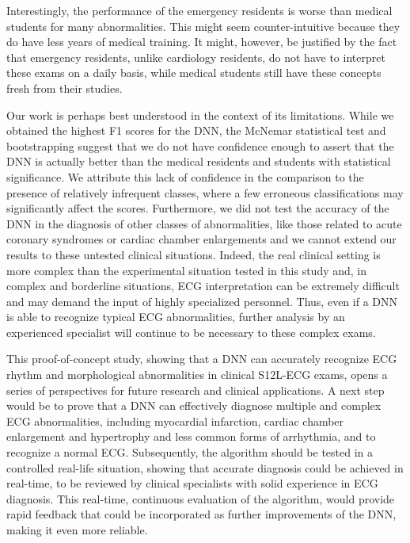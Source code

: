 \documentclass{article}
\begin{document}
Interestingly, the performance of the emergency residents is worse than medical students for many abnormalities. This might seem counter-intuitive because they do have less years of medical training. It might, however, be justified by the fact that emergency residents, unlike cardiology residents, do not have to interpret these exams on a daily basis, while medical students still have these concepts fresh from their studies.


Our work is perhaps best understood in the context of its limitations. While we obtained the highest F1 scores for the DNN, the McNemar statistical test and bootstrapping suggest that we do not have confidence enough to assert that the DNN is actually better than the medical residents and students with statistical significance. We attribute this lack of confidence in the comparison to the presence of relatively infrequent classes, where a few erroneous classifications may significantly affect the scores. Furthermore, we did not test the accuracy of the DNN in the diagnosis of other classes of abnormalities, like those related to acute coronary syndromes or cardiac chamber enlargements and we cannot extend our results to these untested clinical situations.  Indeed, the real clinical setting is  more complex than the experimental situation tested in this study and, in complex and borderline situations, ECG interpretation can be extremely difficult and may demand the input of highly specialized personnel. Thus, even if a DNN is able to recognize typical ECG abnormalities, further analysis by an experienced specialist will continue to be necessary to these complex exams. 

This proof-of-concept study, showing that a DNN can accurately recognize ECG rhythm and morphological abnormalities in clinical S12L-ECG exams, opens a series of perspectives for future research and clinical applications. A next step would be to prove that a DNN can effectively diagnose multiple and complex ECG abnormalities, including myocardial infarction, cardiac chamber enlargement and hypertrophy and less common forms of arrhythmia, and to recognize a normal ECG. Subsequently, the algorithm should be tested in a controlled real-life situation, showing that accurate diagnosis could be achieved in real-time, to be reviewed by clinical specialists with solid experience in ECG diagnosis. This real-time, continuous evaluation of the algorithm, would provide rapid feedback that could be incorporated as further improvements of the DNN, making it even more reliable.
\end{document}
